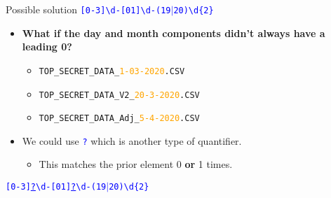 \documentclass[
	usenames,
	dvipsnames,
] {beamer}
\newcommand{\reDigit}{\textbackslash{}d}
\newcommand{\rePattern}[1]{{\Large\texttt{\textcolor{blue}{#1}}}}
\begin{document}
\begin{frame}{Possible solution}
	\hspace*{3em}
	\rePattern{[0-3]\reDigit-[01]\reDigit-(19$|$20)\reDigit\{2\}}
		\pause
	\bigskip	
	\begin{itemize}[label=\textbullet]
		\item \textbf{What if the day and month components didn't always have a leading 0?}
		      \pause
		      \begin{itemize}[label=\textendash]
			      	\item \texttt{TOP\_SECRET\_DATA\_\textcolor{orange}{1-03-2020}.CSV}
			      	\item \texttt{TOP\_SECRET\_DATA\_V2\_\textcolor{orange}{20-3-2020}.CSV}
			      	\item \texttt{TOP\_SECRET\_DATA\_Adj\_\textcolor{orange}{5-4-2020}.CSV}
		      \end{itemize}
		      		\pause
		      \bigskip
		\item We could use \rePattern{?} which is another type of quantifier. \\
			\pause
		      \medskip		      
		      \begin{itemize}[label=\textendash]
		      		\item This matches the prior element 0 \textbf{or} 1 times.		      			
		      \end{itemize}
		      		\pause	      		      
	\end{itemize}
	
	\bigskip
      \hspace*{3em}
      \rePattern{[0-3]\underline{?}\reDigit-[01]\underline{?}\reDigit-(19$|$20)\reDigit\{2\}}
\end{frame}
    
\end{document}
